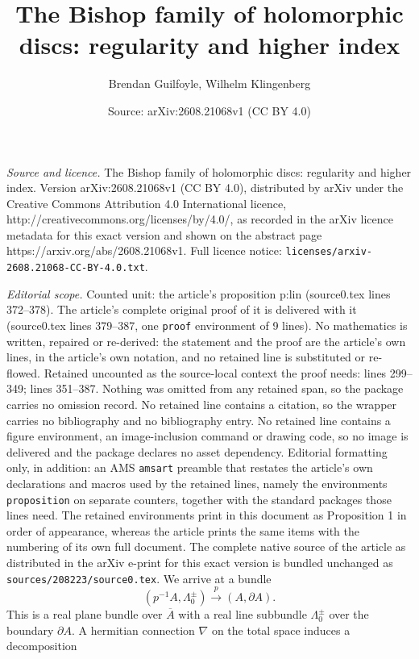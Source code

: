 \documentclass[10pt,a4paper]{amsart}
\title{The Bishop family of holomorphic discs: regularity and higher index}
\author{Brendan Guilfoyle, Wilhelm Klingenberg}
\date{Source: arXiv:2608.21068v1 (CC BY 4.0)}
\newcommand{\be}{\begin{equation}}
\newcommand{\ee}{\end{equation}}
\begin{document}
\maketitle

\noindent\emph{Source and licence.} The Bishop family of holomorphic discs: regularity and higher index. Version arXiv:2608.21068v1 (CC BY 4.0), distributed by arXiv under the Creative Commons Attribution 4.0 International licence, http://creativecommons.org/licenses/by/4.0/, as recorded in the arXiv licence metadata for this exact version and shown on the abstract page https://arxiv.org/abs/2608.21068v1. Full licence notice: \texttt{licenses/arxiv-2608.21068-CC-BY-4.0.txt}.\par\smallskip

\noindent\textit{Editorial scope.} Counted unit: the article's proposition p:lin (source0.tex lines 372--378). The article's complete original proof of it is delivered with it (source0.tex lines 379--387, one \texttt{proof} environment of 9 lines). No mathematics is written, repaired or re-derived: the statement and the proof are the article's own lines, in the article's own notation, and no retained line is substituted or re-flowed.  Retained uncounted as the source-local context the proof needs: lines 299--349; lines 351--387.  Nothing was omitted from any retained span, so the package carries no omission record.  No retained line contains a citation, so the wrapper carries no bibliography and no bibliography entry.  No retained line contains a figure environment, an image-inclusion command or drawing code, so no image is delivered and the package declares no asset dependency.  Editorial formatting only, in addition: an AMS \texttt{amsart} preamble that restates the article's own declarations and macros used by the retained lines, namely the environments \texttt{proposition} on separate counters, together with the standard packages those lines need.  The retained environments print in this document as Proposition 1 in order of appearance, whereas the article prints the same items with the numbering of its own full document.  The complete native source of the article as distributed in the arXiv e-print for this exact version is bundled unchanged as \texttt{sources/208223/source0.tex}.
 We arrive at a bundle
\be \label{b}
(p^{-1} A , \Lambda_0^\pm) \stackrel{p}\longrightarrow (A, \partial A).
\ee
This is a real plane bundle over $\overline{A}$ with a real line subbundle $\Lambda_0^\pm$ over the boundary $\partial A$.
A hermitian connection $\nabla$ on the total space induces a decomposition 
\end{document}
